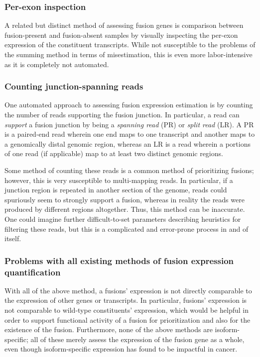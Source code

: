 \subsubsection{Per-exon inspection}

A related but distinct method of assessing fusion genes is comparison between fusion-present and fusion-absent samples by visually inspecting the per-exon expression of the constituent transcripts. While not susceptible to the problems of the summing method in terms of misestimation, this is even more labor-intensive as it is completely not automated.

\subsubsection{Counting junction-spanning reads}

One automated approach to assessing fusion expression estimation is by counting the number of reads supporting the fusion junction. In particular, a read can \textit{support} a fusion junction by being a \textit{spanning read} (PR) or \textit{split read} (LR). A PR is a paired-end read wherein one end maps to one transcript and another maps to a genomically distal genomic region, whereas an LR is a read wherein a portions of one read (if applicable) map to at least two distinct genomic regions.

Some method of counting these reads is a common method of prioritizing fusions; however, this is very susceptible to multi-mapping reads. In particular, if a junction region is repeated in another section of the genome, reads could spuriously seem to strongly support a fusion, whereas in reality the reads were produced by different regions altogether. Thus, this method can be inaccurate. One could imagine further difficult-to-set parameters describing heuristics for filtering these reads\cite{mcpherson_defuse:_2011}, but this is a complicated and error-prone process in and of itself.

\subsubsection{Problems with all existing methods of fusion expression quantification}

With all of the above method, a fusions' expression is not directly comparable to the expression of other genes or transcripts. In particular, fusions' expression is not comparable to wild-type constituents' expression, which would be helpful in order to support functional activity of a fusion for prioritization and also for the existence of the fusion. Furthermore, none of the above methods are isoform-specific; all of these merely assess the expression of the fusion gene as a whole, even though isoform-specific expression has found to be impactful in cancer\cite{christofk_m2_2008}\cite{hovanes_-cateninsensitive_2001}\cite{_insulin_2003}.



